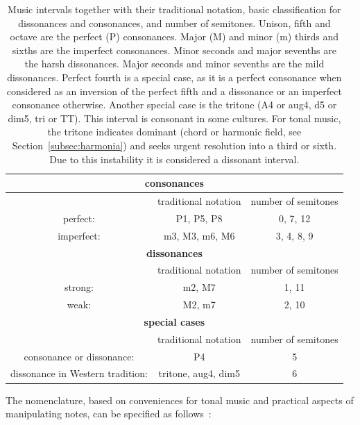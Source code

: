 \begin{table}[htp!]
\centering
\caption{Music intervals together with their traditional notation, basic classification for dissonances and consonances, and number of semitones. Unison, fifth and octave are the perfect (P) consonances. Major (M) and minor (m) thirds and sixths are the imperfect consonances. Minor seconds and major sevenths are the harsh dissonances. Major seconds and minor sevenths are the mild dissonances. Perfect fourth is a special case, as it is a perfect consonance when considered as an inversion of the perfect fifth and a dissonance or an imperfect consonance otherwise. Another special case is the tritone (A4 or aug4, d5 or dim5, tri or TT). This interval is consonant in some cultures.
	For tonal music, the tritone indicates dominant (chord or harmonic field, see Section~\ref{subsec:harmonia}) and seeks urgent resolution into a third or sixth. Due to this instability it is considered a dissonant interval.}
\begin{tabular}{ c | c | c }\hline
    \multicolumn{3}{c}{\bf consonances}  \\\hline
   & traditional notation & number of semitones \\
   perfect: & P1, P5, P8 & 0, 7, 12 \\
 imperfect: & m3, M3, m6, M6 & 3, 4, 8, 9 \\\hline\hline
    \multicolumn{3}{c}{\bf dissonances} \\\hline
 & traditional notation & number of semitones \\
 strong: & m2, M7 & 1, 11 \\
 weak: & M2, m7 & 2, 10 \\\hline\hline
    \multicolumn{3}{c}{\bf special cases} \\\hline
 & traditional notation & number of semitones \\
 consonance or dissonance: & P4 & 5 \\
 dissonance in Western tradition: & tritone, aug4, dim5 & 6 \\\hline
\end{tabular}\label{eq:intervalos}
\end{table}

The nomenclature, based on conveniences for tonal music and practical aspects of manipulating notes, can be specified
as follows~\cite{Roederer,Wisnick}:

